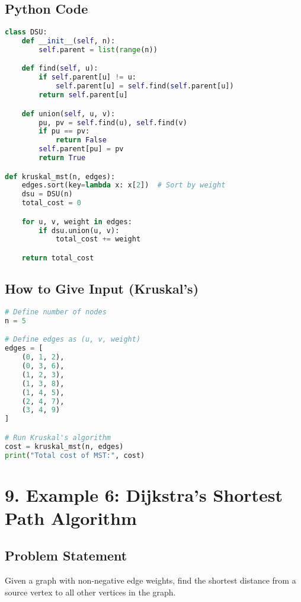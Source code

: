 \documentclass[14pt]{extarticle}
\begin{document}
\subsection*{Python Code}
\begin{lstlisting}[language=Python]
class DSU:
    def __init__(self, n):
        self.parent = list(range(n))

    def find(self, u):
        if self.parent[u] != u:
            self.parent[u] = self.find(self.parent[u])
        return self.parent[u]

    def union(self, u, v):
        pu, pv = self.find(u), self.find(v)
        if pu == pv:
            return False
        self.parent[pu] = pv
        return True

def kruskal_mst(n, edges):
    edges.sort(key=lambda x: x[2])  # Sort by weight
    dsu = DSU(n)
    total_cost = 0

    for u, v, weight in edges:
        if dsu.union(u, v):
            total_cost += weight

    return total_cost
\end{lstlisting}

\newpage

\subsection*{How to Give Input (Kruskal's)}

\begin{lstlisting}[language=Python]
# Define number of nodes
n = 5

# Define edges as (u, v, weight)
edges = [
    (0, 1, 2),
    (0, 3, 6),
    (1, 2, 3),
    (1, 3, 8),
    (1, 4, 5),
    (2, 4, 7),
    (3, 4, 9)
]

# Run Kruskal's algorithm
cost = kruskal_mst(n, edges)
print("Total cost of MST:", cost)
\end{lstlisting}


\section*{9. Example 6: Dijkstra's Shortest Path Algorithm}

\subsection*{Problem Statement}

Given a graph with non-negative edge weights, find the shortest distance from a source vertex to all other vertices in the graph.
\end{document}
